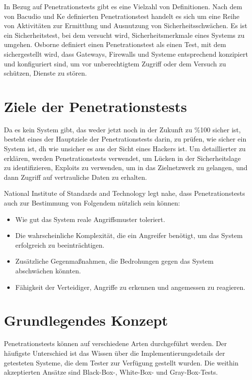 In Bezug auf Penetrationstests gibt es eine Vielzahl von Definitionen. Nach dem von Bacudio\cite{bacudio2011overview} und Ke\cite{ke2009using} definierten Penetrationstest handelt es sich um eine Reihe von Aktivitäten zur Ermittlung und Ausnutzung von Sicherheitsschwächen. Es ist ein Sicherheitstest, bei dem versucht wird, Sicherheitsmerkmale eines Systems zu umgehen\cite{wack2003guideline}. Osborne definiert einen Penetrationstest als einen Test, mit dem sichergestellt wird, dass Gateways, Firewalls und Systeme entsprechend konzipiert und konfiguriert sind, um vor unberechtigtem Zugriff oder dem Versuch zu schützen, Dienste zu stören\cite{osborne2006cheat}.

\section{Ziele der Penetrationstests}

Da es kein System gibt, das weder jetzt noch in der Zukunft zu \%100 sicher ist, besteht eines der Hauptziele der Penetrationstests darin, zu prüfen, wie sicher ein System ist, dh wie unsicher es aus der Sicht eines Hackers ist. Um detaillierter zu erklären, werden Penetrationstests verwendet, um Lücken in der Sicherheitslage zu identifizieren, Exploits zu verwenden, um in das Zielnetzwerk zu gelangen, und dann Zugriff auf vertrauliche Daten zu erhalten\cite{yeo2013using}.

National Institute of Standards and Technology legt nahe, dass Penetrationstests auch zur Bestimmung von Folgendem nützlich sein können\cite{scarfone2008technical}: 

\begin{itemize}
	\item Wie gut das System reale Angriffsmuster toleriert.
	\item Die wahrscheinliche Komplexität, die ein Angreifer benötigt, um das System erfolgreich zu beeinträchtigen.
	\item Zusätzliche Gegenmaßnahmen, die Bedrohungen gegen das System abschwächen könnten.
	\item Fähigkeit der Verteidiger, Angriffe zu erkennen und angemessen zu reagieren.
\end{itemize}

\section{Grundlegendes Konzept}

Penetrationstests können auf verschiedene Arten durchgeführt werden. Der häufigste Unterschied ist das Wissen über die Implementierungsdetails der getesteten Systeme, die dem Tester zur Verfügung gestellt wurden. Die weithin akzeptierten Ansätze sind Black-Box-, White-Box- und Gray-Box-Tests.

